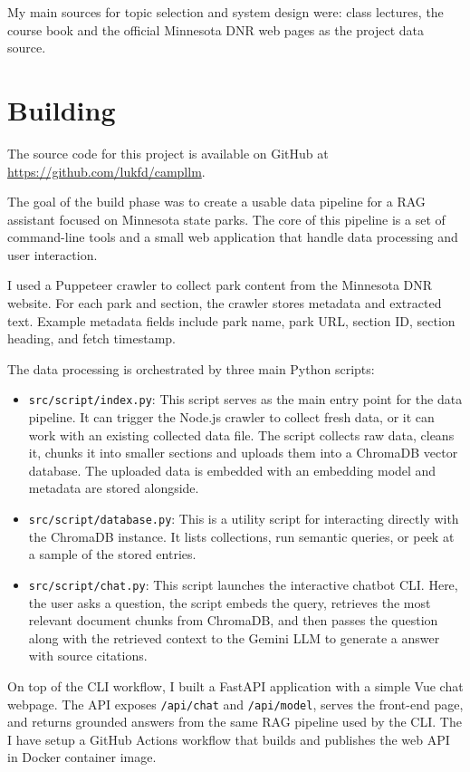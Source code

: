 \documentclass[11pt]{article}
\begin{document}
My main sources for topic selection and system design were: class lectures, the course book and the official Minnesota DNR web pages as the project data source.

\section{Building}
The source code for this project is available on GitHub at \href{https://github.com/lukfd/campllm}{https://github.com/lukfd/campllm}.

The goal of the build phase was to create a usable data pipeline for a RAG assistant focused on Minnesota state parks. The core of this pipeline is a set of command-line tools and a small web application that handle data processing and user interaction.

I used a Puppeteer crawler to collect park content from the Minnesota DNR website. For each park and section, the crawler stores metadata and extracted text. Example metadata fields include park name, park URL, section ID, section heading, and fetch timestamp.

The data processing is orchestrated by three main Python scripts:
\begin{itemize}
    \item \texttt{src/script/index.py}: This script serves as the main entry point for the data pipeline. It can trigger the Node.js crawler to collect fresh data, or it can work with an existing collected data file. The script collects raw data, cleans it, chunks it into smaller sections and uploads them into a ChromaDB \cite{chroma} vector database. The uploaded data is embedded with an embedding model and metadata are stored alongside.
    \item \texttt{src/script/database.py}: This is a utility script for interacting directly with the ChromaDB instance. It lists collections, run semantic queries, or peek at a sample of the stored entries.
    \item \texttt{src/script/chat.py}: This script launches the interactive chatbot CLI. Here, the user asks a question, the script embeds the query, retrieves the most relevant document chunks from ChromaDB, and then passes the question along with the retrieved context to the Gemini LLM \cite{gemini} to generate a answer with source citations.
\end{itemize}

On top of the CLI workflow, I built a FastAPI application with a simple Vue chat webpage. The API exposes \texttt{/api/chat} and \texttt{/api/model}, serves the front-end page, and returns grounded answers from the same RAG pipeline used by the CLI. The I have setup a GitHub Actions workflow that builds and publishes the web API in Docker container image.
\end{document}
